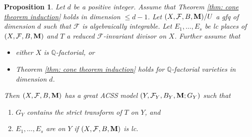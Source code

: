 \documentclass[11pt]{amsart}
\numberwithin{equation}{section}
\newcommand{\Mm}{{\bf{M}}}
\newcommand{\Qq}{\mathbb{Q}}
\newcommand{\Ff}{\mathcal{F}}
\newtheorem{prop}[thm]{Proposition}
\theoremstyle{definition}
\theoremstyle{definition}
\theoremstyle{definition}
\begin{document}
\begin{prop}\label{prop: cone d-1 imply * dim d part 1}
Let $d$ be a positive integer. Assume that Theorem \ref{thm: cone theorem induction} holds in dimension $\leq d-1$. Let $(X,\Ff,B,\Mm)/U$ a gfq of dimension $d$ such that $\Ff$ is algebraically integrable. Let $E_1,\dots,E_s$ be lc places of $(X,\Ff,B,\Mm)$ and $T$ a reduced $\Ff$-invariant divisor on $X$. Further assume that
\begin{itemize}
    \item either $X$ is $\Qq$-factorial, or 
    \item Theorem \ref{thm: cone theorem induction} holds for $\Qq$-factorial varieties in dimension $d$. 
\end{itemize}
Then $(X,\Ff,B,\Mm)$ has a great ACSS model $(Y,\Ff_Y,B_Y,\Mm;G_Y)$ such that
\begin{enumerate}
\item $G_Y$ contains the strict transform of $T$ on $Y$, and
\item $E_1,\dots,E_s$ are on $Y$ if $(X,\Ff,B,\Mm)$ is lc.
\end{enumerate}
\end{prop}
\end{document}
